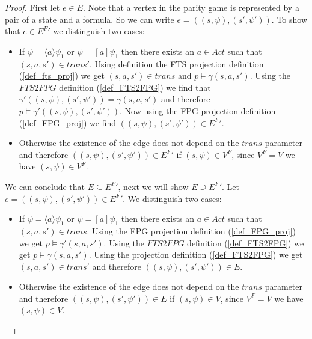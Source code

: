 \begin{theorem}
\begin{proof}
		First let $e \in E$. Note that a vertex in the parity game is represented by a pair of a state and a formula. So we can write $e = ((s,\psi),(s',\psi'))$. To show that $e \in {E^F}'$ we distinguish two cases:
		\begin{itemize}
			\item  If $\psi = \langle a \rangle \psi_1$ or $\psi = [a] \psi_1$ then there exists an $a \in Act$ such that $(s,a,s') \in trans'$. Using definition the FTS projection definition (\ref{def_fts_proj}) we get $(s,a,s') \in trans$ and $p \models \gamma(s,a,s')$. Using the $FTS2FPG$ definition (\ref{def_FTS2FPG}) we find that $\gamma'((s,\psi),(s',\psi')) = \gamma(s,a,s')$ and therefore $p \models \gamma'((s,\psi),(s',\psi'))$. Now using the FPG projection definition (\ref{def_FPG_proj}) we find $((s,\psi),(s',\psi')) \in {E^F}'$.
			\item Otherwise the existence of the edge does not depend on the $trans$ parameter and therefore $((s,\psi),(s',\psi')) \in {E^F}'$ if $(s,\psi) \in V^F$, since $V^F = V$ we have $(s,\psi) \in V^F$.
		\end{itemize}
		We can conclude that $E \subseteq {E^F}'$, next we will show $E \supseteq {E^F}'$. Let $e = ((s,\psi),(s',\psi')) \in {E^F}'$. We distinguish two cases:
		\begin{itemize}
			\item If $\psi = \langle a \rangle \psi_1$ or $\psi = [a] \psi_1$ then there exists an $a \in Act$ such that $(s,a,s') \in trans$. Using the FPG projection definition (\ref{def_FPG_proj}) we get $p \models \gamma'(s,a,s')$. Using the $FTS2FPG$ definition (\ref{def_FTS2FPG}) we get $p \models \gamma(s,a,s')$. Using the projection definition (\ref{def_FTS2FPG}) we get $(s,a,s') \in trans'$ and therefore $((s,\psi),(s',\psi'))\in E$.
			\item Otherwise the existence of the edge does not depend on the $trans$ parameter and therefore $((s,\psi),(s',\psi')) \in E$ if $(s,\psi) \in V$, since $V^F = V$ we have $(s,\psi) \in V$.
		\end{itemize}
	\end{proof}
\end{theorem}


